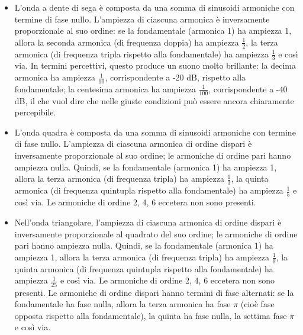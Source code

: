 \begin{itemize}

\item L'onda a dente di sega è composta da una somma di sinusoidi armoniche con termine di fase nullo. L'ampiezza di ciascuna armonica è inversamente proporzionale al suo ordine: se la fondamentale (armonica 1) ha ampiezza 1, allora la seconda armonica (di frequenza doppia) ha ampiezza $\frac{1}{2}$, la terza armonica (di frequenza tripla rispetto alla fondamentale) ha ampiezza $\frac{1}{3}$ e così via. In termini percettivi, questo produce un suono molto brillante: la decima armonica ha ampiezza $\frac{1}{10}$, corrispondente a -20 dB, rispetto alla fondamentale; la centesima armonica ha ampiezza $\frac{1}{100}$, corrispondente a -40 dB, il che vuol dire che nelle giuste condizioni può essere ancora chiaramente percepibile.

\item L'onda quadra è composta da una somma di sinusoidi armoniche con termine di fase nullo. L'ampiezza di ciascuna armonica di ordine dispari è inversamente proporzionale al suo ordine; le armoniche di ordine pari hanno ampiezza nulla. Quindi, se la fondamentale (armonica 1) ha ampiezza 1, allora la terza armonica (di frequenza tripla) ha ampiezza $\frac{1}{3}$, la quinta armonica (di frequenza quintupla rispetto alla fondamentale) ha ampiezza $\frac{1}{5}$ e così via. Le armoniche di ordine 2, 4, 6 eccetera non sono presenti.

\item Nell'onda triangolare, l'ampiezza di ciascuna armonica di ordine dispari è inversamente proporzionale al quadrato del suo ordine; le armoniche di ordine pari hanno ampiezza nulla. Quindi, se la fondamentale (armonica 1) ha ampiezza 1, allora la terza armonica (di frequenza tripla) ha ampiezza $\frac{1}{9}$, la quinta armonica (di frequenza quintupla rispetto alla fondamentale) ha ampiezza $\frac{1}{25}$ e così via. Le armoniche di ordine 2, 4, 6 eccetera non sono presenti. Le armoniche di ordine dispari hanno termini di fase alternati: se la fondamentale ha fase nulla, allora la terza armonica ha fase $\pi$ (cioè fase opposta rispetto alla fondamentale), la quinta ha fase nulla, la settima fase $\pi$ e così via.


\end{itemize}
